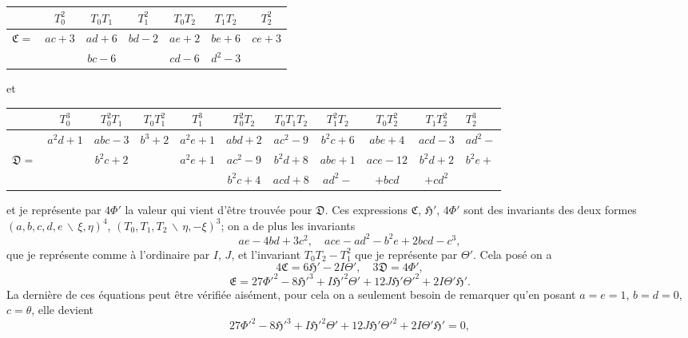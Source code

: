 \documentclass[11pt,a4paper]{book}
\begin{document}
\begin{center}
\renewcommand{\arraystretch}{1.3}
\begin{tabular}{|c|c|c|c|c|c|c|}
\hline
& $T_{0}^{2}$ & $T_{0}T_{1}$ & $T_{1}^{2}$ & $T_{0}T_{2}$ & $T_{1}T_{2}$ & $T_{2}^{2}$ \\
\hline
$\mathfrak{C}=$ & $ac+3$ & $ad+6$ & $bd-2$ & $ae+2$ & $be+6$ & $ce+3$ \\
& & $bc-6$ & & $cd-6$ & $d^{2}-3$ & \\
\hline
\end{tabular}
\end{center}

et

\begin{center}
\renewcommand{\arraystretch}{1.3}
\begin{tabular}{|c|c|c|c|c|c|c|c|c|c|}
\hline
& $T_{0}^{3}$ & $T_{0}^{2}T_{1}$ & $T_{0}T_{1}^{2}$ & $T_{1}^{3}$ & $T_{0}^{2}T_{2}$ & $T_{0}T_{1}T_{2}$ & $T_{1}^{2}T_{2}$ & $T_{0}T_{2}^{2}$ & $T_{1}T_{2}^{2}$ & $T_{2}^{3}$ \\
\hline
& $a^{2}d+1$ & $abc-3$ & $b^{3}+2$ & $a^{2}e+1$ & $abd+2$ & $ac^{2}-9$ & $b^{2}c+6$ & $abe+4$ & $acd-3$ & $ad^{2}-$ \\
$\mathfrak{D}=$ & & $b^{2}c+2$ & & $a^{2}e+1$ & $ac^{2}-9$ & $b^{2}d+8$ & $abe+1$ & $ace-12$ & $b^{2}d+2$ & $b^{2}e+$ \\
& & & & & $b^{2}c+4$ & $acd+8$ & $ad^{2}-$ & $+bcd$ & $+cd^{2}$ & \\
\hline
\end{tabular}
\end{center}

\newpage

et je repr\'{e}sente par $4\Phi'$ la valeur qui vient d'\^{e}tre trouv\'{e}e pour $\mathfrak{D}$.
Ces expressions $\mathfrak{C}$, $\mathfrak{H}'$, $4\Phi'$ sont des invariants des deux formes
$(a,b,c,d,e\,\backslash\!\!\,\xi,\eta)^{4}$, $(T_{0},T_{1},T_{2}\,\backslash\!\!\,\eta,-\xi)^{3}$;
on a de plus les invariants
\[ae-4bd+3c^{2}, \quad ace-ad^{2}-b^{2}e+2bcd-c^{3},\]
que je repr\'{e}sente comme \`{a} l'ordinaire par $I$, $J$, et l'invariant $T_{0}T_{2}-T_{1}^{2}$
que je repr\'{e}sente par $\Theta'$. Cela pos\'{e} on a
\[4\mathfrak{C} = 6\mathfrak{H}' - 2I\Theta', \quad 3\mathfrak{D} = 4\Phi',\]
\[\mathfrak{E} = 27\Phi'^{2} - 8\mathfrak{H}'^{3} + I\mathfrak{H}'^{2}\Theta' + 12J\mathfrak{H}'\Theta'^{2} + 2I\Theta'\mathfrak{H}'.\]
La derni\`{e}re de ces \'{e}quations peut \^{e}tre v\'{e}rifi\'{e}e ais\'{e}ment, pour cela on a seulement
besoin de remarquer qu'en posant $a=e=1$, $b=d=0$, $c=\theta$, elle devient
\[27\Phi'^{2} - 8\mathfrak{H}'^{3} + I\mathfrak{H}'^{2}\Theta' + 12J\mathfrak{H}'\Theta'^{2} + 2I\Theta'\mathfrak{H}' = 0,\]
\end{document}
